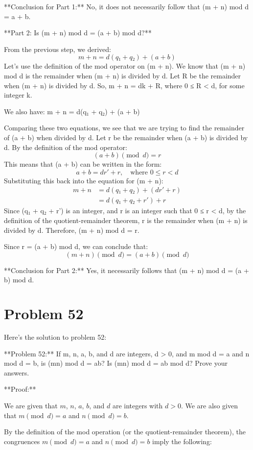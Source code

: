 \documentclass{article}
\begin{document}
**Conclusion for Part 1:** No, it does not necessarily follow that (m + n) mod d = a + b.

**Part 2: Is (m + n) mod d = (a + b) mod d?**

From the previous step, we derived:
$$
m + n = d(q₁ + q₂) + (a + b)
$$
Let's use the definition of the mod operator on (m + n). We know that (m + n) mod d is the remainder when (m + n) is divided by d.
Let R be the remainder when (m + n) is divided by d.
So, m + n = dk + R, where 0 ≤ R < d, for some integer k.

We also have:
m + n = d(q₁ + q₂) + (a + b)

Comparing these two equations, we see that we are trying to find the remainder of (a + b) when divided by d.
Let r be the remainder when (a + b) is divided by d. By the definition of the mod operator:
$$
(a + b) \pmod d = r
$$
This means that (a + b) can be written in the form:
$$
a + b = dr' + r, \quad \text{where } 0 \le r < d
$$
Substituting this back into the equation for (m + n):
$$
\begin{align*}
m + n &= d(q₁ + q₂) + (dr' + r) \\
&= d(q₁ + q₂ + r') + r
\end{align*}
$$
Since (q₁ + q₂ + r') is an integer, and r is an integer such that 0 ≤ r < d, by the definition of the quotient-remainder theorem, r is the remainder when (m + n) is divided by d.
Therefore, (m + n) mod d = r.

Since r = (a + b) mod d, we can conclude that:
$$
(m + n) \pmod d = (a + b) \pmod d
$$

**Conclusion for Part 2:** Yes, it necessarily follows that (m + n) mod d = (a + b) mod d.

\newpage

\section*{Problem 52}
Here's the solution to problem 52:

**Problem 52:** If m, n, a, b, and d are integers, d > 0, and m mod d = a and n mod d = b, is (mn) mod d = ab? Is (mn) mod d = ab mod d? Prove your answers.

**Proof:**

We are given that $m$, $n$, $a$, $b$, and $d$ are integers with $d > 0$.
We are also given that $m \pmod{d} = a$ and $n \pmod{d} = b$.

By the definition of the mod operation (or the quotient-remainder theorem), the congruences $m \pmod{d} = a$ and $n \pmod{d} = b$ imply the following:
\end{document}
